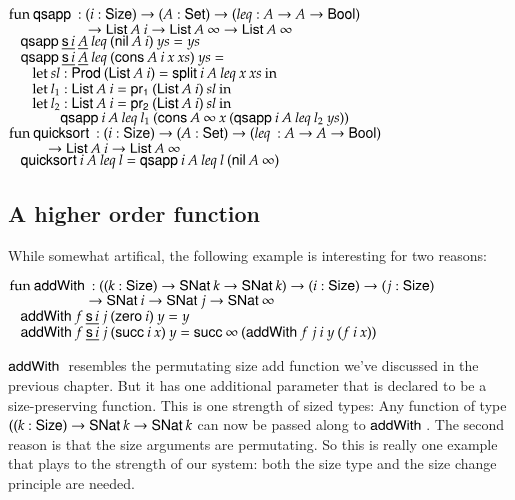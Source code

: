 \begin{bsp}
$\mathrm{fun}\: \mathsf{qsapp}\: : (i : \mathsf{Size} ) \rightarrow ( A : \mathsf{Set} ) \rightarrow ( leq : A \rightarrow A \rightarrow \mathsf{Bool}) $\\
$\spcx \spcx \ra \List A \: i \ra \List A \: \infty \ra \List A \: \infty$\\
$\hspace*{3mm} \mathsf{qsapp}\: \underline{\mathsf{s}\, i} \: \underline{A} \: leq \: (\mathsf{nil}\: A \: i) \:             ys = ys$\\
$\hspace*{3mm} \mathsf{qsapp}\: \underline{\mathsf{s}\, i} \: \underline{A} \: leq \: (\mathsf{cons}\: A \: i \: x \: xs) \: ys = $\\
$\spc \spc  \ELet{sl}{\ProdT (\List A \:i)}{\pivot i \: A \: leq \: x \: xs}$\\
$\spc \spc  \ELet{l_1}{\List A \: i}{\pra (\List A \: i) \: sl}$\\
$\spc \spc  \ELet{l_2}{\List A \: i}{\prb (\List A \: i) \: sl}$\\
$\spc \spcx \qsapp i \: A \: leq \: l_1 \: (\cons A \: \infty \: x \: (\qsapp i \: A \: leq \: l_2 \: ys))$\\

$\mathrm{fun}\: \mathsf{quicksort}\: : (i : \mathsf{Size} ) \rightarrow (A : \mathsf{Set} ) \rightarrow (\mathit{leq}\: : A \rightarrow A \rightarrow \mathsf{Bool})$\\ 
$\spcx	\ra \List A\: i \ra \List A\: \infty$\\
$\hspace*{3mm} \mathsf{quicksort}\: i\: A\: leq \: l = \mathsf{qsapp}\: i\: A\: leq \: l \: (\mathsf{nil}\: A\: \infty)$ 
\end{bsp}

\subsection{A higher order function}
While somewhat artifical, the following example is interesting for two reasons:
\begin{bsp}
$\mathrm{fun}\: \mathsf{addWith}\: : ((k : \mathsf{Size} ) \rightarrow \mathsf{SNat}\: k \rightarrow \mathsf{SNat}\: k ) \rightarrow (i : \mathsf{Size} ) \rightarrow (j : \mathsf{Size} ) $\\
$\spcx \spcx \ra  \SNat i \ra \SNat j \ra \SNat \infty $\\
$\hspace*{3mm} \mathsf{addWith}\: f \: \underline{\mathsf{s}\, i} \: j \: (\mathsf{zero}\: i) \: y = y $ \\
$\hspace*{3mm} \mathsf{addWith}\: f \: \underline{\mathsf{s}\, i} \: j \: (\mathsf{succ}\: i \: x) \: y = \mathsf{succ}\: \infty \: (\mathsf{addWith}\: f \: j \: i \: y \: (f \: i \: x))$
\end{bsp}
$\mathsf{addWith}\:$ resembles the permutating size add function we've discussed in the previous chapter.
But it has one additional parameter that is declared to be a size-preserving function.
This is one strength of sized types: Any function of type  $ ((k : \mathsf{Size} ) \rightarrow \mathsf{SNat}\: k \rightarrow \mathsf{SNat}\: k $ can now
be passed along to $\mathsf{addWith}\:$.
The second reason is that the size arguments are permutating. 
So this is really one example that plays to the strength of our system: both the size type and the size change principle are needed.
